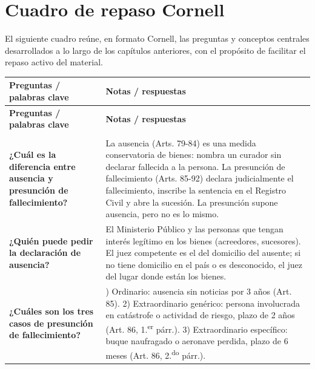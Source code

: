 \documentclass[12pt,oneside]{book}
\begin{document}
\chapter{Cuadro de repaso Cornell}

El siguiente cuadro reúne, en formato Cornell, las preguntas y conceptos
centrales desarrollados a lo largo de los capítulos anteriores, con el
propósito de facilitar el repaso activo del material.

\begin{longtable}{
    >{\raggedright\arraybackslash}p{}
    >{\raggedright\arraybackslash}p{}
}
\toprule
\textbf{Preguntas / palabras clave} & \textbf{Notas / respuestas} \\
\midrule
\endfirsthead

\toprule
\textbf{Preguntas / palabras clave} & \textbf{Notas / respuestas} \\
\midrule
\endhead

\midrule
\multicolumn{2}{r}{\textit{Continúa en la página siguiente}} \\
\endfoot

\bottomrule
\endlastfoot

\textbf{¿Cuál es la diferencia entre ausencia y presunción de fallecimiento?} &
La ausencia (Arts. 79-84) es una medida conservatoria de bienes: nombra
un curador sin declarar fallecida a la persona. La presunción de
fallecimiento (Arts. 85-92) declara judicialmente el fallecimiento,
inscribe la sentencia en el Registro Civil y abre la sucesión. La
presunción supone ausencia, pero no es lo mismo. \\

\textbf{¿Quién puede pedir la declaración de ausencia?} &
El Ministerio Público y las personas que tengan interés legítimo en los
bienes (acreedores, sucesores). El juez competente es el del domicilio
del ausente; si no tiene domicilio en el país o es desconocido, el juez
del lugar donde están los bienes. \\

\textbf{¿Cuáles son los tres casos de presunción de fallecimiento?} &
1) Ordinario: ausencia sin noticias por 3 años (Art. 85). 2)
Extraordinario genérico: persona involucrada en catástrofe o actividad de
riesgo, plazo de 2 años (Art. 86, 1.\textsuperscript{er} párr.). 3)
Extraordinario específico: buque naufragado o aeronave perdida, plazo de
6 meses (Art. 86, 2.\textsuperscript{do} párr.). \\


\end{longtable}
\end{document}
